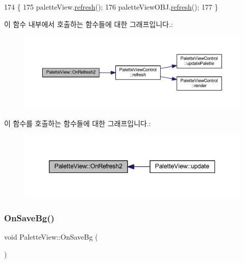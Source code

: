 \begin{DoxyCode}
174 \{
175   paletteView.\mbox{\hyperlink{class_palette_view_control_aace3ab97afe8216b3873159ee852779f}{refresh}}();
176   paletteViewOBJ.\mbox{\hyperlink{class_palette_view_control_aace3ab97afe8216b3873159ee852779f}{refresh}}();  
177 \}
\end{DoxyCode}
이 함수 내부에서 호출하는 함수들에 대한 그래프입니다.\+:
\nopagebreak
\begin{figure}[H]
\begin{center}
\leavevmode
\includegraphics[width=350pt]{class_palette_view_ae5eaa6866be56bc87f8fe73033947c7d_cgraph}
\end{center}
\end{figure}
이 함수를 호출하는 함수들에 대한 그래프입니다.\+:
\nopagebreak
\begin{figure}[H]
\begin{center}
\leavevmode
\includegraphics[width=345pt]{class_palette_view_ae5eaa6866be56bc87f8fe73033947c7d_icgraph}
\end{center}
\end{figure}
\mbox{\label{class_palette_view_a4e11f19e5535efcd1b34d38899f18482}} 
\subsubsection{\texorpdfstring{On\+Save\+Bg()}{OnSaveBg()}}
{\footnotesize\ttfamily void Palette\+View\+::\+On\+Save\+Bg (\begin{DoxyParamCaption}{ }\end{DoxyParamCaption})\hspace{0.3cm}{\ttfamily [protected]}}



